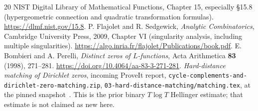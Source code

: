 \documentclass[11pt,letterpaper]{article}
\theoremstyle{remark}
\numberwithin{equation}{section}
\begin{document}
\begin{thebibliography}{20}
NIST Digital Library of Mathematical Functions, Chapter 15, especially
\S15.8 (hypergeometric connection and quadratic transformation formulas).
\url{https://dlmf.nist.gov/15.8}.
P. Flajolet and R. Sedgewick, \emph{Analytic Combinatorics},
Cambridge University Press, 2009, Chapter VI (singularity analysis,
including multiple singularities).
\url{https://algo.inria.fr/flajolet/Publications/book.pdf}.
E. Bombieri and A. Perelli, \emph{Distinct zeros of $L$-functions},
Acta Arithmetica \textbf{83} (1998), 271--281.
\url{https://doi.org/10.4064/aa-83-3-271-281}.
\emph{Hard-distance matching of Dirichlet zeros}, incoming ProveIt report,
\texttt{cycle-complements-and-dirichlet-zero-matching.zip},
\texttt{03-hard-distance-matching/matching.tex},
at the pinned snapshot~\cite{ProveIt}. This is the prior binary
$T\log T$ Hellinger estimate; that estimate is not claimed as new here.
\end{thebibliography}
\endgroup
\end{document}
